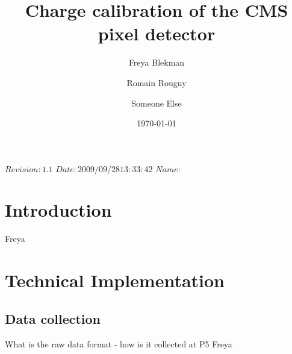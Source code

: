  \RCS$Revision: 1.1 $
 \RCS$Date: 2009/09/28 13:33:42 $
 \RCS$Name:  $

\title{Charge calibration of the CMS pixel detector}%

\address[unkno]{unknown}
\address[ua]{Universiteit Antwerpen}
\address[cu]{Cornell University}
\author[cu]{Freya Blekman}
\author[ua]{Romain Rougny}
\author[unkno]{Someone Else}

\date{\today}


\maketitle %

\section{Introduction}
Freya
\section{Technical Implementation}
\subsection{Data collection}
What is the raw data format - how is it collected at P5
Freya
